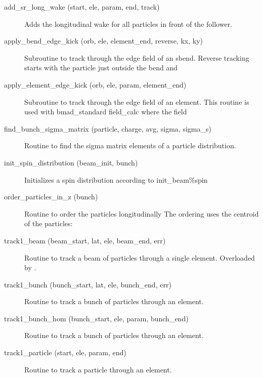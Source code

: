 \begin{description}

\label{r:add.sr.long.wake}
\item[add_sr_long_wake (start, ele, param, end, track)] \Newline 
Adds the longitudinal wake for all particles in front of the follower.

\label{r:apply.bend.edge.kick}
\item[apply_bend_edge_kick (orb, ele, element_end, reverse, kx, ky)] \Newline 
Subroutine to track through the edge field of an sbend.
Reverse tracking starts with the particle just outside the bend and

\label{r:apply.element.edge.kick}
\item[apply_element_edge_kick (orb, ele, param, element_end)] \Newline 
Subroutine to track through the edge field of an element.
This routine is used with bmad_standard field_calc where the field

\label{r:find.bunch.sigma.matrix}
\item[find_bunch_sigma_matrix (particle, charge, avg, sigma, sigma_s)] \Newline 
Routine to find the sigma matrix elements of a particle distribution.

\label{r:init.spin.distribution}
\item[init_spin_distribution (beam_init, bunch)] \Newline 
Initializes a spin distribution according to init_beam\%spin

\label{r:order.particles.in.z}
\item[order_particles_in_z (bunch)] \Newline 
Routine to order the particles longitudinally 
The ordering uses the centroid of the particles:

\label{r:track1.beam}
\item[track1_beam (beam_start, lat, ele, beam_end, err)] \Newline 
Routine to track a beam of particles through a single element.
Overloaded by .

\label{r:track1.bunch}
\item[track1_bunch (bunch_start, lat, ele, bunch_end, err)] \Newline 
Routine to track a bunch of particles through an element.

\label{r:track1.bunch.hom}
\item[track1_bunch_hom (bunch_start, ele, param, bunch_end)] \Newline 
Routine to track a bunch of particles through an element.

\label{r:track1.particle}
\item[track1_particle (start, ele, param, end)] \Newline 
Routine to track a particle through an element.

\end{description}

